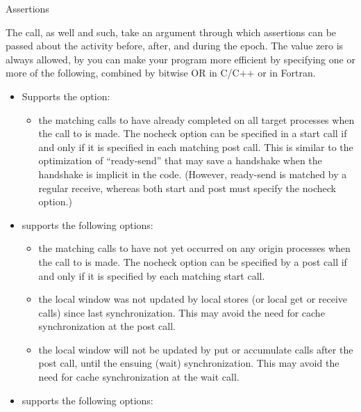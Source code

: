  {Assertions}
\label{sec:mpi-assert}

The  call, as well  and such, take an argument
through which assertions can be passed about the activity before, after, and during the epoch.
The value zero is always allowed, by you can make your program more efficient by specifying
one or more of the following, combined by bitwise OR in C/C++ or
 in Fortran.

\begin{itemize}
\item {} Supports the option:
  \begin{itemize}
    \item {} the matching calls to  have already
    completed on all target processes when the call to  is
    made. The nocheck option can be specified in a start call if and
    only if it is specified in each matching post call. This is similar
    to the optimization of ``ready-send'' that may save a handshake when
    the handshake is implicit in the code. (However, ready-send is
    matched by a regular receive, whereas both start and post must
    specify the nocheck option.)
  \end{itemize}
\item {} supports the following options:
  \begin{itemize}
  \item {} the matching calls to  have not
    yet occurred on any origin processes when the call to 
    is made. The nocheck option can be specified by a post call if and
    only if it is specified by each matching start call.
  \item {} the local window was not updated by local
    stores (or local get or receive calls) since last
    synchronization. This may avoid the need for cache synchronization
    at the post call.
  \item {} the local window will not be updated by put or
    accumulate calls after the post call, until the ensuing (wait)
    synchronization. This may avoid the need for cache synchronization
    at the wait call.
  \end{itemize}
\item {} supports the following options:

\end{itemize}
